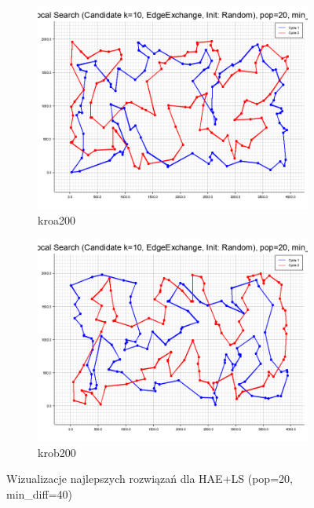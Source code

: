 \documentclass[12pt,a4paper]{article}
\begin{document}
\begin{figure}[H]
\begin{adjustwidth}{-1cm}{-1cm}
    \centering
    \begin{subfigure}[b]{0.5\textwidth}
        \centering
        \includegraphics[width=\textwidth]{figures/kroa200_HAE_LS_Base_Local_Search_Candidate_k_10_EdgeExchange_Init_Random__pop_20_min_diff_40_.png}
        \caption{kroa200}
    \end{subfigure}%
    \hfill
    \begin{subfigure}[b]{0.5\textwidth}
        \centering
        \includegraphics[width=\textwidth]{figures/krob200_HAE_LS_Base_Local_Search_Candidate_k_10_EdgeExchange_Init_Random__pop_20_min_diff_40_.png}
        \caption{krob200}
    \end{subfigure}
    \caption{Wizualizacje najlepszych rozwiązań dla HAE+LS (pop=20, min\_diff=40)}
    \label{fig:hae}
\end{adjustwidth}
\end{figure}
\end{document}
